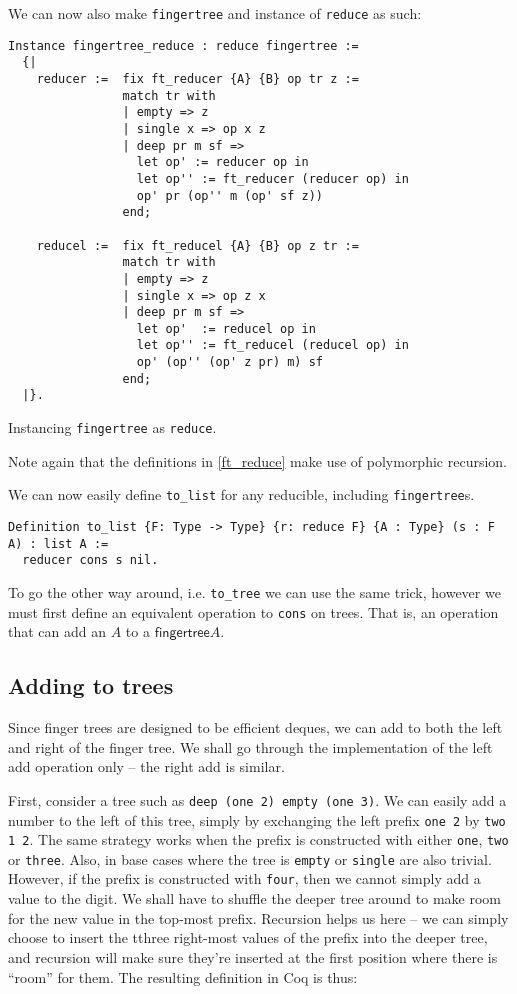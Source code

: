 \documentclass{article}
\newcommand{\code}[1]{\texttt{#1}}
\begin{document}
We can now also make \code{fingertree} and instance of \code{reduce} as such:

\begin{listing}[H]
\begin{verbatim}
Instance fingertree_reduce : reduce fingertree :=
  {|
    reducer :=  fix ft_reducer {A} {B} op tr z :=
                match tr with
                | empty => z
                | single x => op x z
                | deep pr m sf =>
                  let op' := reducer op in
                  let op'' := ft_reducer (reducer op) in
                  op' pr (op'' m (op' sf z))
                end;

    reducel :=  fix ft_reducel {A} {B} op z tr :=
                match tr with
                | empty => z
                | single x => op z x
                | deep pr m sf =>
                  let op'  := reducel op in
                  let op'' := ft_reducel (reducel op) in
                  op' (op'' (op' z pr) m) sf
                end;
  |}.
\end{verbatim}
\caption{Instancing \code{fingertree} as \code{reduce}.}
\label{ft_reduce}
\end{listing}

Note again that the definitions in \ref{ft_reduce} make use of polymorphic
recursion.

We can now easily define \code{to\_list} for any reducible, including \code{fingertree}s.

\begin{verbatim}
Definition to_list {F: Type -> Type} {r: reduce F} {A : Type} (s : F A) : list A :=
  reducer cons s nil.
\end{verbatim}

To go the other way around, i.e. \code{to\_tree} we can use the same trick, however
we must first define an equivalent operation to \code{cons} on trees. That is,
an operation that can add an $A$ to a $\textsf{fingertree} A$.

\subsection{Adding to trees}
Since finger trees are designed to be efficient deques, we can add to both the
left and right of the finger tree. We shall go through the implementation
of the left add operation only -- the right add is similar.

First, consider a tree such as \code{deep (one 2) empty (one 3)}. We can easily
add a number to the left of this tree, simply by exchanging the left prefix
\code{one 2} by \code{two 1 2}. The same strategy works when the prefix is
constructed with either \code{one}, \code{two} or \code{three}. Also, in
base cases where the tree is \code{empty} or \code{single} are also trivial.
However, if the prefix is constructed with \code{four},
then we cannot simply add a value to the digit.
We shall have to shuffle the deeper tree around to make room
for the new value in the top-most prefix. Recursion helps us here -- we can
simply choose to insert the tthree right-most values of the prefix into the
deeper tree, and recursion will make sure they're inserted at the first position
where there is ``room'' for them. The resulting definition in Coq is thus:
\end{document}
